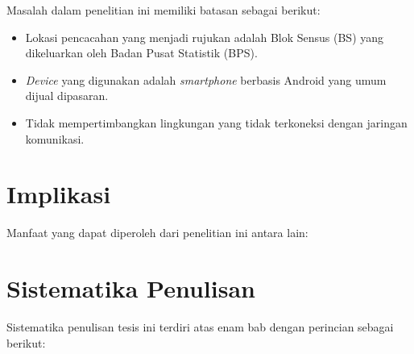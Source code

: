 Masalah dalam penelitian ini memiliki batasan sebagai berikut:

\begin{itemize}
\item Lokasi pencacahan yang menjadi rujukan adalah Blok Sensus (BS) yang dikeluarkan oleh Badan Pusat Statistik (BPS).
\item \textit{Device} yang digunakan adalah \textit{smartphone} berbasis Android yang umum dijual dipasaran.
\item Tidak mempertimbangkan lingkungan yang tidak terkoneksi dengan jaringan komunikasi.
\end{itemize}


\section{Implikasi}

Manfaat yang dapat diperoleh dari penelitian ini antara lain:


\section{Sistematika Penulisan}

Sistematika penulisan tesis ini terdiri atas enam bab dengan perincian sebagai berikut:

